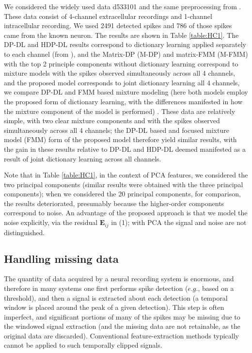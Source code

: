 \documentclass[journal]{IEEEtran}
\def\bf{\mathbf}
\newcommand{\Emat}{{\bf E}}
\begin{document}
We considered
the widely used data d533101 and the same
preprocessing from \cite{Calabrese2010}.
  These data consist of 4-channel extracellular recordings and 1-channel
  intracellular recording.  We used 2491 detected spikes and 786 of those
  spikes came from the known neuron. The results are shown in Table \ref{table:HC1}.
   The DP-DL and HDP-DL results correspond to dictionary learning applied separately to each channel (from \cite{Bo2011}), and the Matrix-DP (M-DP) and matrix-FMM (M-FMM) with the top 2 principle components without dictionary learning correspond to mixture models with the spikes observed simultaneously across all 4 channels, and the proposed model corresponds to joint dictionary learning all 4 channels, we compare DP-DL and FMM based mixture modeling (here both models employ the proposed form of dictionary learning, with the differences manifested in how the mixture component of the model is performed) . These data are relatively simple, with two clear mixture components and with the spikes observed simultaneously across all 4 channels; the DP-DL based and focused mixture model (FMM) form of the proposed model therefore yield similar results, with the gain in these results relative to DP-DL and HDP-DL deemed manifested as a result of joint dictionary learning across all channels. 
   
Note that in Table \ref{table:HC1}, in the context of PCA features, we considered the two principal components (similar results were obtained with the three principal components); when we considered the 20 principal components, for comparison, the results deteriorated, presumably because the higher-order components correspond to noise. An advantage of the proposed approach is that we model the noise explicitly, via the residual $\Emat_{ij}$ in (1); with PCA the signal and noise are not distinguished.

\subsection{Handling missing data}

The quantity of data acquired by a neural recording system is enormous, and therefore in many systems one first performs spike detection ($e.g.$, based on a threshold), and then a signal is extracted about each detection (a temporal window is placed around the peak of a given detection). This step is often imperfect, and significant portions of many of the spikes may be missing due to the windowed signal extraction (and the missing data are not retainable, as the original data are discarded). Conventional feature-extraction methods typically cannot be applied to such temporally clipped signals.
\end{document}
